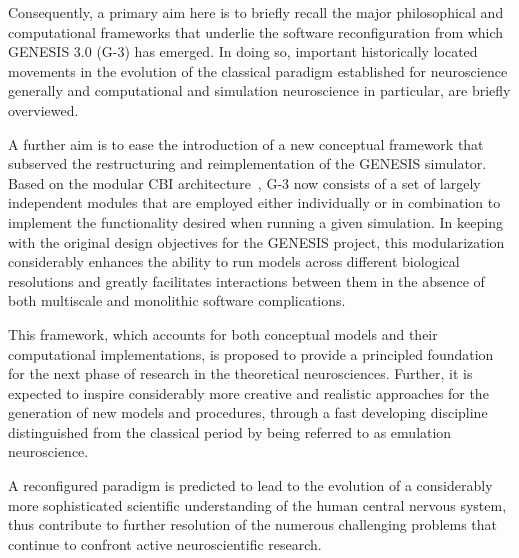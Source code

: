 \documentclass[11pt,3p,twocolumn]{JMN}
\begin{document}
Consequently, a primary aim here is to briefly recall the major philosophical and computational frameworks that underlie the software reconfiguration from which GENESIS 3.0 (G-3) has emerged. In doing so, important historically located movements in the evolution of the classical paradigm established for neuroscience generally and computational and simulation neuroscience in particular, are briefly overviewed.

A further aim is to ease the introduction of a new conceptual framework that subserved the restructuring and reimplementation of the GENESIS simulator. Based on the modular CBI architecture~\citep{cornelis12}, G-3 now consists of a set of largely independent modules that are employed either individually or in combination to implement the functionality desired when running a given simulation. In keeping with the original design objectives for the GENESIS project, this modularization considerably enhances the ability to run models across different biological resolutions and greatly facilitates interactions between them in the absence of both multiscale and monolithic software complications.

 This framework, which accounts for both conceptual models and their computational implementations, is proposed to provide a principled foundation for the next phase of research in the theoretical neurosciences. Further, it is expected to inspire considerably more creative and realistic approaches for the generation of new models and procedures, through a fast developing discipline distinguished from the classical period by being referred to as emulation neuroscience.

A reconfigured paradigm is predicted to lead to the evolution of a considerably more sophisticated scientific understanding of the human central nervous system, thus contribute to further resolution of the numerous challenging problems that continue to confront active neuroscientific research.
\end{document}
